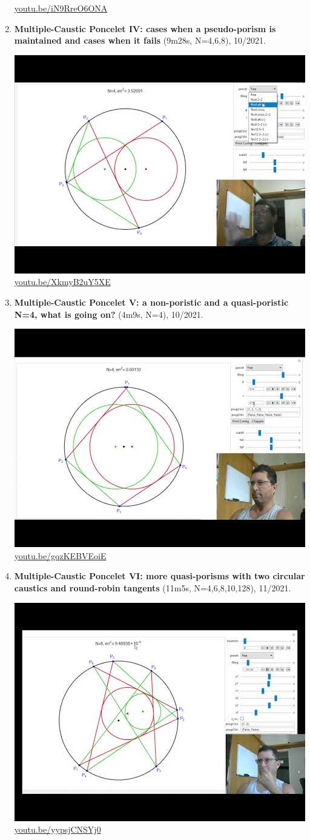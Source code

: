 \documentclass[12pt]{amsart}
\begin{document}
\begin{enumerate}[resume]
\begin{center}
\href{https://youtu.be/iN9RreO6ONA}{\url{youtu.be/iN9RreO6ONA}}\end{center}
% 
\item \textbf{Multiple-Caustic Poncelet IV: cases when a pseudo-porism is maintained and cases when it fails} (9m28s, N=4,6,8), 10/2021. 
\begin{center}\includegraphics[width=.5\textwidth]{pics/XkmyB2uY5XE.jpg} \\ 
\href{https://youtu.be/XkmyB2uY5XE}{\url{youtu.be/XkmyB2uY5XE}}\end{center}
% 
\item \textbf{Multiple-Caustic Poncelet V: a non-poristic and a quasi-poristic N=4, what is going on?} (4m9s, N=4), 10/2021. 
\begin{center}\includegraphics[width=.5\textwidth]{pics/gqzKEBVEoiE.jpg} \\ 
\href{https://youtu.be/gqzKEBVEoiE}{\url{youtu.be/gqzKEBVEoiE}}\end{center}
% 
\item \textbf{Multiple-Caustic Poncelet VI: more quasi-porisms with two circular caustics and round-robin tangents} (11m5s, N=4,6,8,10,128), 11/2021. 
\begin{center}\includegraphics[width=.5\textwidth]{pics/yypsjCNSYj0.jpg} \\ 
\href{https://youtu.be/yypsjCNSYj0}{\url{youtu.be/yypsjCNSYj0}}\end{center}
% 
\end{enumerate}
\end{document}

